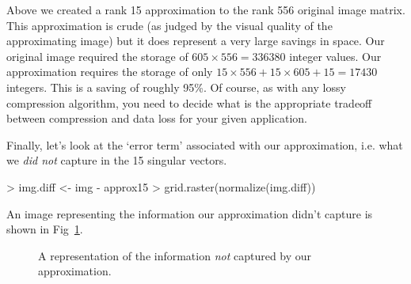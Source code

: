 Above we created a rank 15 approximation to the rank 556 original image matrix. This approximation is crude (as judged by the visual quality of the approximating image) but it does represent a very large savings in space. Our original image required the storage of $605 \times 556 = 336380$ integer values. Our approximation requires the storage of only $15 \times 556 + 15 \times 605 + 15 = 17430$ integers. This is a saving of roughly 95\%. Of course, as with any lossy compression algorithm, you need to decide what is the appropriate tradeoff between compression and data loss for your given application.

Finally, let's look at the `error term' associated with our approximation, i.e. what we \emph{did not} capture in the 15 singular vectors.
%
\begin{R}
> img.diff <- img - approx15
> grid.raster(normalize(img.diff))
\end{R}
%
An image representing the information our approximation didn't capture is shown in Fig~\ref{fig:chesterdiff}.
%
\begin{figure}[ht!]
  \caption{A representation of the information \emph{not} captured by our approximation.\label{fig:chesterdiff}}
\end{figure}
  


